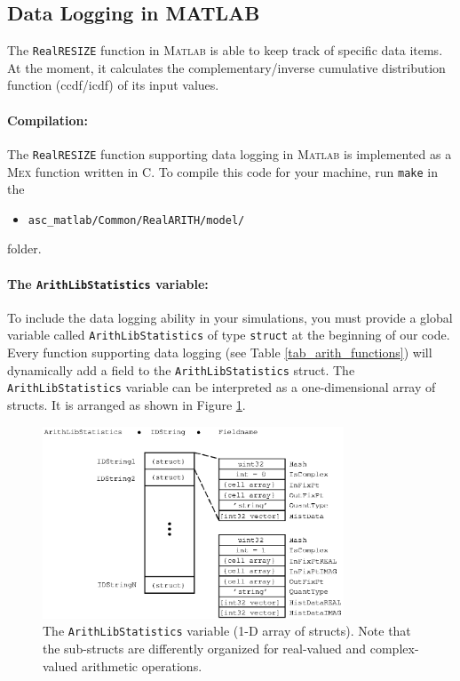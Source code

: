 \documentclass[a4paper,11pt]{article}
\begin{document}
\subsection{Data Logging in MATLAB}
The \texttt{RealRESIZE} function in \textsc{Matlab} is able to keep
track of specific data items. At the moment, it calculates the
complementary/inverse cumulative distribution function (ccdf/icdf) of
its input values.

\paragraph{Compilation:}
The \texttt{RealRESIZE} function supporting data logging in
\textsc{Matlab} is implemented as a \textsc{Mex} function written in
C. To compile this code for your machine, run \texttt{make} in the
\begin{itemize}
\item \texttt{asc\_matlab/Common/RealARITH/model/}
\end{itemize}
folder.

\paragraph{The \texttt{ArithLibStatistics} variable:}
To include the data logging ability in your simulations, you must
provide a global variable called \texttt{ArithLibStatistics} of type
\texttt{struct} at the beginning of our code. Every function
supporting data logging (see Table \ref{tab_arith_functions}) will
dynamically add a field to the \texttt{ArithLibStatistics} struct. The
\texttt{ArithLibStatistics} variable can be interpreted as a
one-dimensional array of structs. It is arranged as shown in Figure
\ref{fig.ArithLibStatistics}.
\begin{figure}[ht]
  \centering
  \includegraphics[width=0.8\textwidth]{ArithLibStatistics}
  \caption{The \texttt{ArithLibStatistics} variable (1-D array of
    structs). Note that the sub-structs are differently organized for
    real-valued and complex-valued arithmetic operations.}
  \label{fig.ArithLibStatistics}
\end{figure}
\end{document}
